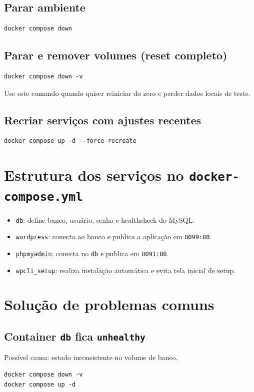 ﻿\documentclass[12pt,a4paper]{article}
\begin{document}
\subsection{Parar ambiente}
\begin{verbatim}
docker compose down
\end{verbatim}

\subsection{Parar e remover volumes (reset completo)}
\begin{verbatim}
docker compose down -v
\end{verbatim}
Use este comando quando quiser reiniciar do zero e perder dados locais de teste.

\subsection{Recriar servi\c{c}os com ajustes recentes}
\begin{verbatim}
docker compose up -d --force-recreate
\end{verbatim}

\section{Estrutura dos servi\c{c}os no \texttt{docker-compose.yml}}
\begin{itemize}
  \item \texttt{db}: define banco, usu\'ario, senha e healthcheck do MySQL.
  \item \texttt{wordpress}: conecta ao banco e publica a aplica\c{c}\~ao em \texttt{8099:80}.
  \item \texttt{phpmyadmin}: conecta no \texttt{db} e publica em \texttt{8091:80}.
  \item \texttt{wpcli\_setup}: realiza instala\c{c}\~ao autom\'atica e evita tela inicial de setup.
\end{itemize}

\section{Solu\c{c}\~ao de problemas comuns}
\subsection{Container \texttt{db} fica \texttt{unhealthy}}
Poss\'ivel causa: estado inconsistente no volume de banco.
\begin{verbatim}
docker compose down -v
docker compose up -d
\end{verbatim}
\end{document}
